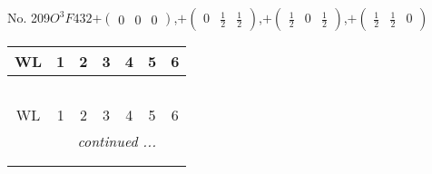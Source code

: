 \documentclass[fleqn,9pt,landscape]{jsarticle}
\begin{document}
\newpage
No. 209\quad$O_{}^{3}$\quad$F432$\quad[ cubic ]\quad$+\begin{pmatrix} 0 & 0 & 0 \end{pmatrix}$,\quad $+\begin{pmatrix} 0 & \frac{1}{2} & \frac{1}{2} \end{pmatrix}$,\quad $+\begin{pmatrix} \frac{1}{2} & 0 & \frac{1}{2} \end{pmatrix}$,\quad $+\begin{pmatrix} \frac{1}{2} & \frac{1}{2} & 0 \end{pmatrix}$
\begin{center}
\renewcommand{\arraystretch}{1.2}
\begin{longtable}{ccccccc}
 \hline \hline
WL & 1 & 2 & 3 & 4 & 5 & 6 \\ \hline \endfirsthead

\multicolumn{6}{l}{\tablename\ \thetable{}} \\
 \hline \hline
WL & 1 & 2 & 3 & 4 & 5 & 6 \\ \hline \endhead

 \hline \hline
\multicolumn{6}{r}{\footnotesize\it continued ...} \\ \endfoot

 \hline \hline
\multicolumn{6}{r}{} \\ \endlastfoot


\end{longtable}
\end{center}
\end{document}
